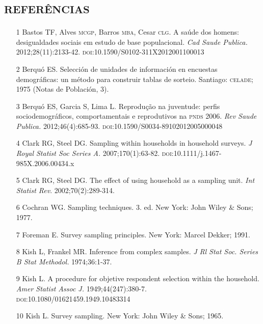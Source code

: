 \documentclass{article}
\begin{document}
\section*{\textsc{referências}}
\begin{itemize}

\item[1] Bastos TF, Alves \textsc{mcgp}, Barros \textsc{mba}, Cesar \textsc{clg}. A saúde dos homens:
desigualdades sociais em estudo de base populacional. \textit{Cad Saude
Publica.}
2012;28(11):2133-42. \textsc{doi}:10.1590/S0102-311X2012001100013

\item[2] Berquó ES. Selección de unidades de información en encuestas
demográficas: un método para construir tablas de sorteio. Santiago: \textsc{celade}; 1975
(Notas de Población, 3).

\item[3] Berquó ES, Garcia S, Lima L. Reprodução na juventude: perfis
sociodemográficos, comportamentais e reprodutivos na \textsc{pnds} 2006. \textit{Rev
Saude Publica. }
2012;46(4):685-93. \textsc{doi}:10.1590/S0034-89102012005000048

\item[4] Clark RG, Steel DG. Sampling within households in household surveys.
\textit{J Royal Statist Soc Series A.}
2007;170(1):63-82. \textsc{doi}:10.1111/j.1467-985X.2006.00434.x

\item[5] Clark RG, Steel DG. The effect of using household as a sampling unit.
\textit{Int Statist Rev}. 2002;70(2):289-314.

\item[6] Cochran WG. Sampling techniques. 3. ed. New York: John Wiley \& Sons;
1977.

\item[7] Foreman E. Survey sampling principles. New York: Marcel Dekker; 1991.

\item[8] Kish L, Frankel MR. Inference from complex samples. \textit{J Rl Stat
Soc. Series B Stat Methodol.}
1974;36:1-37.

\item[9] Kish L. A procedure for objetive respondent selection within the
household. \textit{Amer Statist Assoc J.}
1949;44(247):380-7. \textsc{doi}:10.1080/01621459.1949.10483314

\item[10] Kish L. Survey sampling. New York: John Wiley \& Sons; 1965.


\end{itemize}
\end{document}
